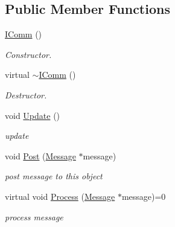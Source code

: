 \subsection*{Public Member Functions}
\begin{DoxyCompactItemize}
\item 
\hypertarget{classFramework_1_1IComm_a91d2cbd9f35f6a7450255cb20cf7fa14}{
\hyperlink{classFramework_1_1IComm_a91d2cbd9f35f6a7450255cb20cf7fa14}{IComm} ()}
\label{classFramework_1_1IComm_a91d2cbd9f35f6a7450255cb20cf7fa14}

\begin{DoxyCompactList}\small\item\em Constructor. \item\end{DoxyCompactList}\item 
\hypertarget{classFramework_1_1IComm_a167fb6095d36210d5480c90c3c31d70e}{
virtual \hyperlink{classFramework_1_1IComm_a167fb6095d36210d5480c90c3c31d70e}{$\sim$IComm} ()}
\label{classFramework_1_1IComm_a167fb6095d36210d5480c90c3c31d70e}

\begin{DoxyCompactList}\small\item\em Destructor. \item\end{DoxyCompactList}\item 
\hypertarget{classFramework_1_1IComm_aa88b4abbff88eee1f5166d3fc4e393e7}{
void \hyperlink{classFramework_1_1IComm_aa88b4abbff88eee1f5166d3fc4e393e7}{Update} ()}
\label{classFramework_1_1IComm_aa88b4abbff88eee1f5166d3fc4e393e7}

\begin{DoxyCompactList}\small\item\em update \item\end{DoxyCompactList}\item 
\hypertarget{classFramework_1_1IComm_a69739979c5587f4992e8bc27c847526d}{
void \hyperlink{classFramework_1_1IComm_a69739979c5587f4992e8bc27c847526d}{Post} (\hyperlink{structFramework_1_1Message}{Message} $\ast$message)}
\label{classFramework_1_1IComm_a69739979c5587f4992e8bc27c847526d}

\begin{DoxyCompactList}\small\item\em post message to this object \item\end{DoxyCompactList}\item 
\hypertarget{classFramework_1_1IComm_a69a30bf48d8c2140885c89e19b0b1ed6}{
virtual void \hyperlink{classFramework_1_1IComm_a69a30bf48d8c2140885c89e19b0b1ed6}{Process} (\hyperlink{structFramework_1_1Message}{Message} $\ast$message)=0}
\label{classFramework_1_1IComm_a69a30bf48d8c2140885c89e19b0b1ed6}

\begin{DoxyCompactList}\small\item\em process message \item\end{DoxyCompactList}\end{DoxyCompactItemize}


